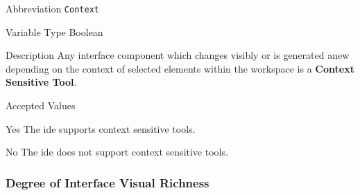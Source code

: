 \begin{AlignedDesc}
  \item[Abbreviation] \texttt{Context}

  \item[Variable Type] Boolean

  \item[Description] Any interface component which changes visibly or is
  generated anew depending on the context of selected elements within the
  workspace is a \textbf{Context Sensitive Tool}.

  \item[Accepted Values]

  \begin{AlignedDesc}
    \item[Yes] The \ac{ide} supports context sensitive tools.
    \item[No] The \ac{ide} does not support context sensitive tools.
  \end{AlignedDesc}

\end{AlignedDesc}

\subsubsection{Degree of Interface Visual Richness}
\label{subsubsec:toolrichness}

